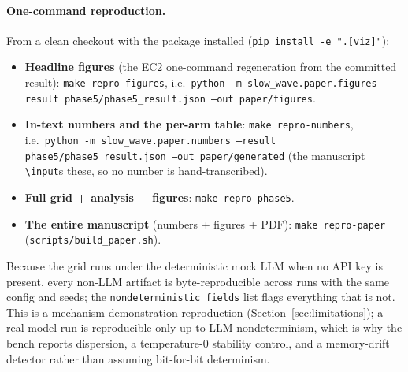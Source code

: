 \paragraph{One-command reproduction.} From a clean checkout with the package
installed (\texttt{pip install -e ".[viz]"}):
\begin{itemize}
  \item \textbf{Headline figures} (the EC2 one-command regeneration from the
  committed result): \texttt{make repro-figures}, i.e.\
  \texttt{python -m slow\_wave.paper.figures --result phase5/phase5\_result.json
  --out paper/figures}.
  \item \textbf{In-text numbers and the per-arm table}:
  \texttt{make repro-numbers}, i.e.\
  \texttt{python -m slow\_wave.paper.numbers --result phase5/phase5\_result.json
  --out paper/generated} (the manuscript \texttt{\textbackslash input}s these, so
  no number is hand-transcribed).
  \item \textbf{Full grid + analysis + figures}: \texttt{make repro-phase5}.
  \item \textbf{The entire manuscript} (numbers + figures + PDF):
  \texttt{make repro-paper} (\texttt{scripts/build\_paper.sh}).
\end{itemize}
Because the grid runs under the deterministic mock LLM when no API key is
present, every non-LLM artifact is byte-reproducible across runs with the same
config and seeds; the \texttt{nondeterministic\_fields} list flags everything
that is not. This is a mechanism-demonstration reproduction
(Section~\ref{sec:limitations}); a real-model run is reproducible only up to LLM
nondeterminism, which is why the bench reports dispersion, a temperature-0
stability control, and a memory-drift detector rather than assuming
bit-for-bit determinism.
